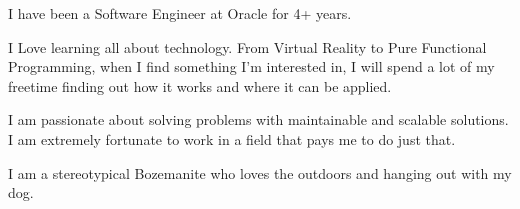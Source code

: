 

\begin{cvparagraph}

I have been a Software Engineer at Oracle for 4+ years.

I Love learning all about technology. From Virtual Reality to Pure Functional Programming, when I find something I'm interested in, I will spend a lot of my freetime finding out how it works and where it can be applied.

I am passionate about solving problems with maintainable and scalable solutions. I am extremely fortunate to work in a field that pays me to do just that.

I am a stereotypical Bozemanite who loves the outdoors and hanging out with my dog.
\end{cvparagraph}
